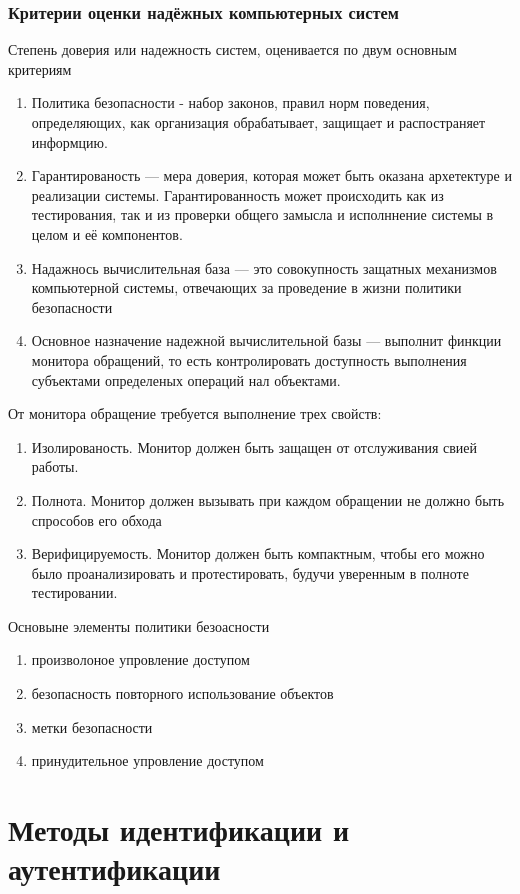 \documentclass[a4paper,12pt]{extarticle}
\begin{document}
	\subsubsection{Критерии оценки надёжных компьютерных систем}
	Степень доверия или надежность систем, оценивается по двум основным критериям 
	\begin{enumerate}
		\item Политика безопасности - набор законов, правил норм поведения, определяющих, как организация обрабатывает, защищает и распостраняет информцию.
		\item Гарантированость --- мера доверия, которая может быть оказана архетектуре и реализации системы. Гарантированность может происходить как из тестирования, так и из проверки общего замысла и исполннение системы в целом и её компонентов.
		\item Надажнось вычислительная база --- это совокупность защатных механизмов компьютерной системы, отвечающих за проведение в жизни политики безопасности
		\item Основное назначение надежной вычислительной базы --- выполнит финкции монитора обращений, то есть контролировать доступность выполнения субъектами определеных операций нал объектами.
	\end{enumerate}
	От монитора обращение требуется выполнение трех свойств:
	\begin{enumerate}
		\item Изолированость. Монитор должен быть защащен от отслуживания свией работы.
		\item Полнота. Монитор должен вызывать при каждом обращении не должно быть спрособов его обхода
		\item Верифицируемость. Монитор должен быть компактным, чтобы его можно было проанализировать и протестировать, будучи уверенным в полноте тестировании.
	\end{enumerate}
	Основыне элементы политики безоасности 
	\begin{enumerate}
		\item произволоное упровление доступом
		\item безопасность повторного использование объектов
		\item метки безопасности
		\item принудительное упровление доступом
	\end{enumerate}


	\section{Методы идентификации и аутентификации}
\end{document}
